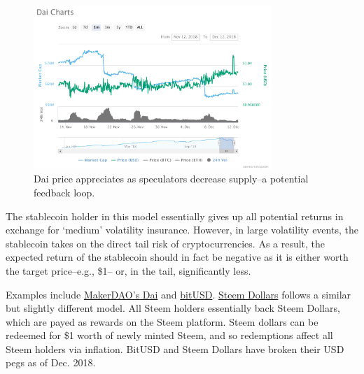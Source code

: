 \documentclass[10pt]{article}
\begin{document}
\begin{figure}
	\centering \includegraphics[width=9cm]{dai_chart}
	\caption{Dai price appreciates as speculators decrease supply--a potential feedback loop.}\label{fig:dai_chart}
\end{figure}


The stablecoin holder in this model essentially gives up all potential returns in exchange for `medium' volatility insurance. However, in large volatility events, the stablecoin takes on the direct tail risk of cryptocurrencies. As a result, the expected return of the stablecoin should in fact be negative as it is either worth the target price--e.g., \$1-- or, in the tail, significantly less.


Examples include \href{https://makerdao.com/dai}{MakerDAO's Dai} and \href{https://bitshares.org/technology/price-stable-cryptocurrencies}{bitUSD}. \href{https://www.steem.center/index.php?title=Steem_Dollar_(SBD)}{Steem Dollars} follows a similar but slightly different model. All Steem holders essentially back Steem Dollars, which are payed as rewards on the Steem platform. Steem dollars can be redeemed for \$1 worth of newly minted Steem, and so redemptions affect all Steem holders via inflation. BitUSD and Steem Dollars have broken their USD pegs as of Dec. 2018.
\end{document}

